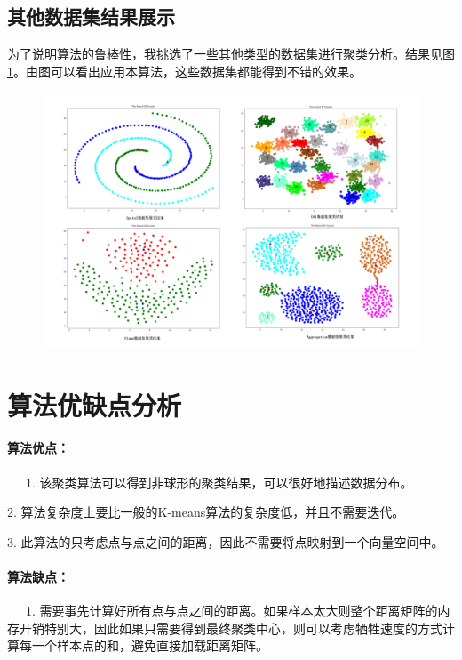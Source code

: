 \subsection{其他数据集结果展示}
为了说明算法的鲁棒性，我挑选了一些其他类型的数据集进行聚类分析。结果见图\ref{figure2}。由图可以看出应用本算法，这些数据集都能得到不错的效果。

\begin{figure}[ht]
\centering
\includegraphics[scale=0.27]{figure/test_2.png}%
\caption{}
\label{figure2}
\end{figure}


\section{算法优缺点分析}
\paragraph{算法优点：\\ }


\ \ \  1. 该聚类算法可以得到非球形的聚类结果，可以很好地描述数据分布。

2. 算法复杂度上要比一般的K-means算法的复杂度低，并且不需要迭代。

3. 此算法的只考虑点与点之间的距离，因此不需要将点映射到一个向量空间中。\\

\paragraph{算法缺点：\\ } 


\ \ \  1. 需要事先计算好所有点与点之间的距离。如果样本太大则整个距离矩阵的内存开销特别大，因此如果只需要得到最终聚类中心，则可以考虑牺牲速度的方式计算每一个样本点的和，避免直接加载距离矩阵。

